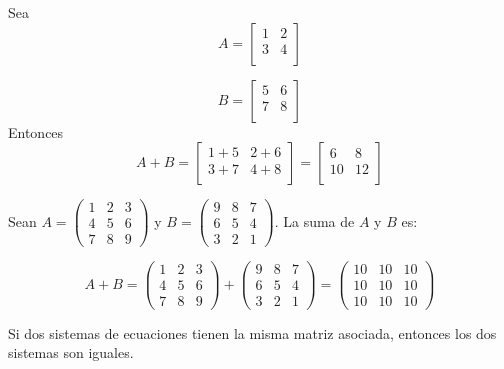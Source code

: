 \begin{example} Sea
$$
A =
\begin{bmatrix}
    1 & 2 \\
    3 & 4 \\
\end{bmatrix}
$$

$$
B =
\begin{bmatrix}
    5 & 6 \\
    7 & 8 \\
\end{bmatrix}
$$ Entonces $$
A + B =
\begin{bmatrix}
    1+5 & 2+6 \\
    3+7 & 4+8 \\
\end{bmatrix}
=
\begin{bmatrix}
    6 & 8 \\
    10 & 12 \\
\end{bmatrix}
$$
\end{example}
\begin{example}
 Sean $A = \begin{pmatrix}
1 & 2 & 3 \\
4 & 5 & 6 \\
7 & 8 & 9
\end{pmatrix}$ y $B = \begin{pmatrix}
9 & 8 & 7 \\
6 & 5 & 4 \\
3 & 2 & 1
\end{pmatrix}$. La suma de $A$ y $B$ es:

\[ A + B = \begin{pmatrix}
1 & 2 & 3 \\
4 & 5 & 6 \\
7 & 8 & 9
\end{pmatrix} + \begin{pmatrix}
9 & 8 & 7 \\
6 & 5 & 4 \\
3 & 2 & 1
\end{pmatrix} = \begin{pmatrix}
10 & 10 & 10 \\
10 & 10 & 10 \\
10 & 10 & 10
\end{pmatrix} \]   
\end{example}
\begin{exercise}
 Si dos sistemas de ecuaciones tienen la misma matriz asociada,
entonces los dos sistemas son iguales.   
\end{exercise}
